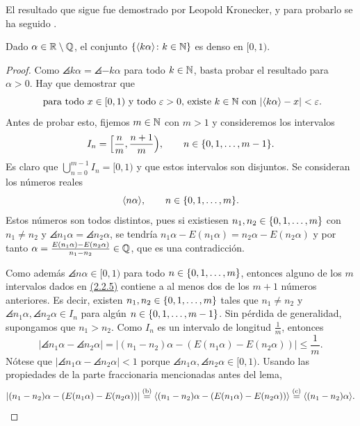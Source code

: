 \documentclass[a4paper, 12pt, oneside]{book}
\begin{document}
El resultado que sigue fue demostrado por Leopold Kronecker, y para probarlo se ha seguido \cite{schmidt}.

\begin{lemma}\label{2.2.3}
    Dado $\alpha \in \mathbb R \setminus \mathbb Q$, el conjunto $\{\langle k\alpha \rangle \colon k \in \mathbb N\}$ es denso en $[0,1)$.
\end{lemma}

\begin{proof}
    Como $\angles{k\alpha} = \angles{-k\alpha}$ para todo $k \in \mathbb N$, basta probar el resultado para $\alpha > 0$. Hay que demostrar que 
    \begin{equation}\label{2.2.4}
    \textup{ para todo } x \in [0,1) \textup{ y todo } \varepsilon > 0 \textup{, existe } k \in \mathbb N \textup{ con } |\langle k\alpha \rangle-x|<\varepsilon.
    \end{equation}
    Antes de probar esto, fijemos $m \in \mathbb N$ con $m > 1$ y consideremos los intervalos
    \begin{equation}\label{2.2.5}
        I_n = \Bigl[\frac{n}{m},\frac{n+1}{m}\Bigr), \qquad n \in \{0,1,\mathellipsis,m-1\}.
    \end{equation}
    Es claro que $\bigcup_{n=0}^{m-1}I_n = [0,1)$ y que estos intervalos son disjuntos. Se consideran los números reales
    \[\langle n\alpha \rangle, \qquad n \in \{0,1,\mathellipsis,m\}.\]
    Estos números son todos distintos, pues si existiesen $n_1,n_2\in\{0,1,\mathellipsis,m\}$ con $n_1 \neq n_2$ y $\angles{n_1\alpha} = \angles{n_2\alpha}$, se tendría $n_1\alpha-E(n_1\alpha) = n_2\alpha-E(n_2\alpha)$ y por tanto $\alpha = \frac{E(n_1\alpha)-E(n_2\alpha)}{n_1-n_2} \in \mathbb Q$, que es una contradicción.
    
    Como además $\angles{n\alpha}\in[0,1)$ para todo $n \in \{0,1,\mathellipsis,m\}$, entonces alguno de los $m$ intervalos dados en \hyperref[2.2.5]{\color{blue}(2.2.5)} contiene a al menos dos de los $m+1$ números anteriores. Es decir, existen  $n_1,n_2 \in \{0,1,\mathellipsis,m\}$ tales que $n_1 \neq n_2$ y $\angles{n_1\alpha},\angles{n_2\alpha} \in I_n$ para algún $n \in \{0,1,\mathellipsis,m-1\}$. Sin pérdida de generalidad, supongamos que $n_1 > n_2$. Como $I_n$ es un intervalo de longitud $\frac{1}{m}$, entonces
    \[|\angles{n_1\alpha}-\angles{n_2\alpha}| = |(n_1-n_2)\alpha -(E(n_1\alpha)-E(n_2\alpha))| \leq \frac{1}{m}.\]
    Nótese que $|\angles{n_1\alpha}-\angles{n_2\alpha}| < 1$ porque $\angles{n_1\alpha},\angles{n_2\alpha} \in [0,1)$. Usando las propiedades de la parte fraccionaria mencionadas antes del lema,
    \[|(n_1-n_2)\alpha -(E(n_1\alpha)-E(n_2\alpha))| \overset{(\textup{b})}{=} \langle (n_1-n_2)\alpha -(E(n_1\alpha)-E(n_2\alpha)) \rangle  \overset{(\textup{c})}{=} \langle (n_1-n_2)\alpha \rangle.\]


\end{proof}
\end{document}
